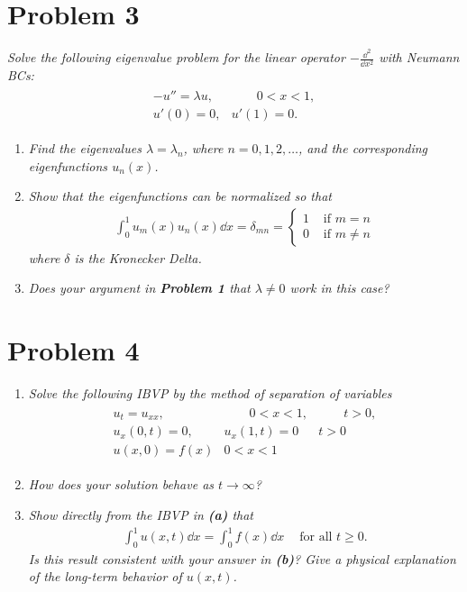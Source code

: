 \documentclass[12pt]{article}
\theoremstyle{plain}
\begin{document}
\section*{Problem 3}
\emph{Solve the following eigenvalue problem for the linear operator $-\frac{\dd^2}{\dd x^2}$ with Neumann BCs:}
\begin{align*}
    \begin{array}{rr}
        -u'' = \lambda u, & \qquad 0 < x < 1, \\
        u'(0) = 0, & u'(1) = 0.
    \end{array}
\end{align*}
\begin{enumerate}[\bf (a)]
    \item 
        \emph{Find the eigenvalues $\lambda = \lambda_n$, where $n = 0, 1, 2, \dots$, and the corresponding eigenfunctions $u_n(x)$.}
    \item
        \emph{Show that the eigenfunctions can be normalized so that}
        \begin{align*}
            \int_0^1 u_m(x) u_n(x) \dd x = \delta_{mn} = \begin{cases}
                1 & \text{ if }m = n \\
                0 & \text{ if }m \neq n
            \end{cases}
        \end{align*}
        \emph{where $\delta$ is the Kronecker Delta.}
    \item
        \emph{Does your argument in \textbf{Problem 1} that $\lambda \neq 0$ work in this case?}
\end{enumerate}

\section*{Problem 4}
\begin{enumerate}[\bf (a)]
    \item
        \emph{Solve the following IBVP by the method of separation of variables}
        \begin{align*}
            \begin{array}{rrr}
                u_t = u_{xx}, & \qquad 0 < x < 1, & \qquad t > 0, \\
                u_x(0, t) = 0, & u_x(1, t) = 0 & t > 0 \\
                u(x, 0) = f(x) & 0 < x < 1
            \end{array}
        \end{align*}
    \item
        \emph{How does your solution behave as $t \rightarrow \infty$?}
    \item
        \emph{Show directly from the IBVP in \textbf{(a)} that}
        \begin{align*}
            \int_0^1 u(x, t) \dd x = \int_0^1 f(x) \dd x\ \ \ \ \text{ for all }t \geq 0.
        \end{align*}
        \emph{Is this result consistent with your answer in \textbf{(b)}?  Give a physical explanation of the long-term behavior of $u(x,t)$.}
\end{enumerate}
\end{document}
